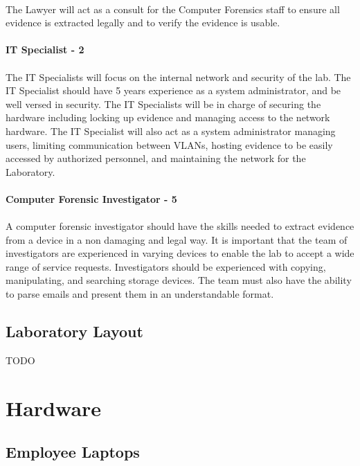 \documentclass{article}
\begin{document}
\paragraph{} The Lawyer will act as a consult for the Computer Forensics staff to ensure all evidence is extracted legally and to verify the evidence is usable.

\paragraph{IT Specialist - 2}
\paragraph{} The IT Specialists will focus on the internal network and security of the lab.  The IT Specialist should have 5 years experience as a system administrator, and be well versed in security.  The IT Specialists will be in charge of securing the hardware including locking up evidence and managing access to the network hardware. The IT Specialist will also act as a system administrator managing users, limiting communication between VLANs, hosting evidence to be easily accessed by authorized personnel, and maintaining the network for the Laboratory.
\paragraph{Computer Forensic Investigator - 5}
\paragraph{}  A computer forensic investigator should have the skills needed to extract evidence from a device in a non damaging and legal way.  It is important that the team of investigators are experienced in varying devices to enable the lab to accept a wide range of service requests.  Investigators should be experienced with copying, manipulating, and searching storage devices.  The team must also have the ability to parse emails and present them in an understandable format.
\subsection{Laboratory Layout}
TODO


\section{Hardware}
\subsection{Employee Laptops} 
\end{document}

